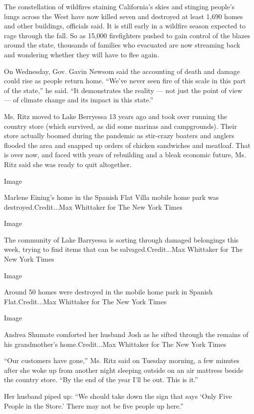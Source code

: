 The constellation of wildfires staining California's skies and stinging
people's lungs across the West have now killed seven and destroyed at
least 1,690 homes and other buildings, officials said. It is still early
in a wildfire season expected to rage through the fall. So as 15,000
firefighters pushed to gain control of the blazes around the state,
thousands of families who evacuated are now streaming back and wondering
whether they will have to flee again.

On Wednesday, Gov. Gavin Newsom said the accounting of death and damage
could rise as people return home. ``We've never seen fire of this scale
in this part of the state,'' he said. ``It demonstrates the reality ---
not just the point of view --- of climate change and its impact in this
state.''

Ms. Ritz moved to Lake Berryessa 13 years ago and took over running the
country store (which survived, as did some marinas and campgrounds).
Their store actually boomed during the pandemic as stir-crazy boaters
and anglers flooded the area and snapped up orders of chicken sandwiches
and meatloaf. That is over now, and faced with years of rebuilding and a
bleak economic future, Ms. Ritz said she was ready to quit altogether.

Image

Marlene Eining's home in the Spanish Flat Villa mobile home park was
destroyed.Credit...Max Whittaker for The New York Times

Image

The community of Lake Barryessa is sorting through damaged belongings
this week, trying to find items that can be salvaged.Credit...Max
Whittaker for The New York Times

Image

Around 50 homes were destroyed in the mobile home park in Spanish
Flat.Credit...Max Whittaker for The New York Times

Image

Andrea Shumate comforted her husband Josh as he sifted through the
remains of his grandmother's home.Credit...Max Whittaker for The New
York Times

``Our customers have gone,'' Ms. Ritz said on Tuesday morning, a few
minutes after she woke up from another night sleeping outside on an air
mattress beside the country store. ``By the end of the year I'll be out.
This is it.''

Her husband piped up: ``We should take down the sign that says `Only
Five People in the Store.' There may not be five people up here.''

